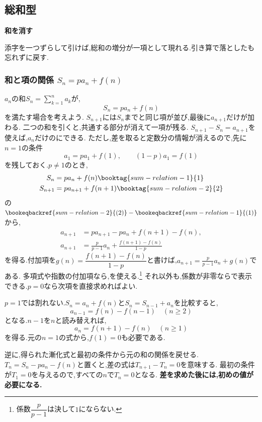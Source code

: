 
\subsection{総和型}\label{節：総和型}
\begin{bookpoint}
  \textbf{和を消す}\par
  添字を一つずらして引けば,総和の増分が一項として現れる.引き算で落としたも忘れずに戻す.
\end{bookpoint}
\subsubsection{\texorpdfstring{和と項の関係  $S_n=pa_n+f(n)$}{和と項の関係}}
$a_n$の和$S_n=\sum_{k=1}^n a_k$が,
\[
  S_n=pa_n+f(n)
\]
を満たす場合を考えよう.
$S_{n+1}$には$S_n$までと同じ項が並び,最後に$a_{n+1}$だけが加わる.
二つの和を引くと,共通する部分が消えて一項が残る.
$S_{n+1}-S_n=a_{n+1}$を使えば,$a_n$だけのにできる.
ただし,差を取ると定数分の情報が消えるので,先に$n=1$の条件
\[
  a_1=pa_1+f(1),\qquad (1-p)a_1=f(1)
\]
を残しておく.$p\ne1$のとき,
\begin{align*}
  S_n&=pa_n+f(n) \booktag{sum-relation-1}{1}\\
  S_{n+1}&=pa_{n+1}+f(n+1) \booktag{sum-relation-2}{2}
\end{align*}
の$\bookeqbackref{sum-relation-2}{(2)}-\bookeqbackref{sum-relation-1}{(1)}$から,
\begin{align*}
  a_{n+1}&=pa_{n+1}-pa_n+f(n+1)-f(n),\\
  a_{n+1}&=\frac p{p-1}a_n+\frac{f(n+1)-f(n)}{1-p}
\end{align*}
を得る.付加項を$g(n)=\dfrac{f(n+1)-f(n)}{1-p}$と書けば,$a_{n+1}=\frac p{p-1}a_n+g(n)$である.
多項式や指数の付加項なら,を使える.\footnote{係数$\dfrac{p}{p-1}$は決して$1$にならない.}
それ以外も,係数が非零ならで表示できる.$p=0$なら次項を直接求めればよい.

$p=1$では割れない.$S_n=a_n+f(n)$と$S_n=S_{n-1}+a_n$を比較すると,
\[
  a_{n-1}=f(n)-f(n-1)\quad(n\ge2)
\]
となる.$n-1$を$n$と読み替えれば,
\[
  a_n=f(n+1)-f(n)\quad(n\ge1)
\]
を得る.元の$n=1$の式から,$f(1)=0$も必要である.

逆に,得られた漸化式と最初の条件から元の和の関係を戻せる.
$T_n=S_n-pa_n-f(n)$と置くと,差の式は$T_{n+1}-T_n=0$を意味する.
最初の条件が$T_1=0$を与えるので,すべての$n$で$T_n=0$となる.
\textbf{差を求めた後には,初めの値が必要になる.}

